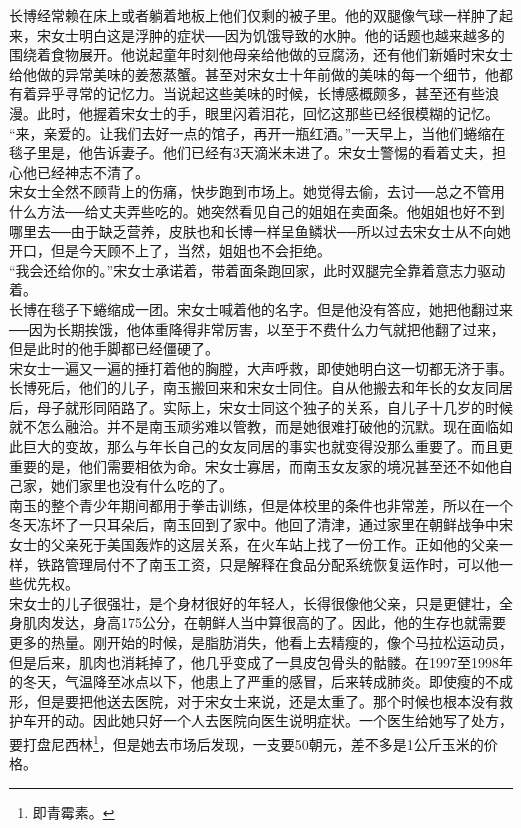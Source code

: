 \begin{multicols}{\theparacolNo}
长博经常赖在床上或者躺着地板上他们仅剩的被子里。他的双腿像气球一样肿了起来，宋女士明白这是浮肿的症状──因为饥饿导致的水肿。他的话题也越来越多的围绕着食物展开。他说起童年时刻他母亲给他做的豆腐汤，还有他们新婚时宋女士给他做的异常美味的姜葱蒸蟹。甚至对宋女士十年前做的美味的每一个细节，他都有着异乎寻常的记忆力。当说起这些美味的时候，长博感概颇多，甚至还有些浪漫。此时，他握着宋女士的手，眼里闪着泪花，回忆这那些已经很模糊的记忆。\\

“来，亲爱的。让我们去好一点的馆子，再开一瓶红酒。”一天早上，当他们蜷缩在毯子里是，他告诉妻子。他们已经有3天滴米未进了。宋女士警惕的看着丈夫，担心他已经神志不清了。\\

宋女士全然不顾背上的伤痛，快步跑到市场上。她觉得去偷，去讨──总之不管用什么方法──给丈夫弄些吃的。她突然看见自己的姐姐在卖面条。他姐姐也好不到哪里去──由于缺乏营养，皮肤也和长博一样呈鱼鳞状──所以过去宋女士从不向她开口，但是今天顾不上了，当然，姐姐也不会拒绝。\\

“我会还给你的。”宋女士承诺着，带着面条跑回家，此时双腿完全靠着意志力驱动着。\\

长博在毯子下蜷缩成一团。宋女士喊着他的名字。但是他没有答应，她把他翻过来──因为长期挨饿，他体重降得非常厉害，以至于不费什么力气就把他翻了过来，但是此时的他手脚都已经僵硬了。\\

宋女士一遍又一遍的捶打着他的胸膛，大声呼救，即使她明白这一切都无济于事。\\

长博死后，他们的儿子，南玉搬回来和宋女士同住。自从他搬去和年长的女友同居后，母子就形同陌路了。实际上，宋女士同这个独子的关系，自儿子十几岁的时候就不怎么融洽。并不是南玉顽劣难以管教，而是她很难打破他的沉默。现在面临如此巨大的变故，那么与年长自己的女友同居的事实也就变得没那么重要了。而且更重要的是，他们需要相依为命。宋女士寡居，而南玉女友家的境况甚至还不如他自己家，她们家里也没有什么吃的了。\\

南玉的整个青少年期间都用于拳击训练，但是体校里的条件也非常差，所以在一个冬天冻坏了一只耳朵后，南玉回到了家中。他回了清津，通过家里在朝鲜战争中宋女士的父亲死于美国轰炸的这层关系，在火车站上找了一份工作。正如他的父亲一样，铁路管理局付不了南玉工资，只是解释在食品分配系统恢复运作时，可以他一些优先权。\\

宋女士的儿子很强壮，是个身材很好的年轻人，长得很像他父亲，只是更健壮，全身肌肉发达，身高175公分，在朝鲜人当中算很高的了。因此，他的生存也就需要更多的热量。刚开始的时候，是脂肪消失，他看上去精瘦的，像个马拉松运动员，但是后来，肌肉也消耗掉了，他几乎变成了一具皮包骨头的骷髅。在1997至1998年的冬天，气温降至冰点以下，他患上了严重的感冒，后来转成肺炎。即使瘦的不成形，但是要把他送去医院，对于宋女士来说，还是太重了。那个时候也根本没有救护车开的动。因此她只好一个人去医院向医生说明症状。一个医生给她写了处方，要打盘尼西林\footnote{即青霉素。}，但是她去市场后发现，一支要50朝元，差不多是1公斤玉米的价格。\\


\end{multicols}
